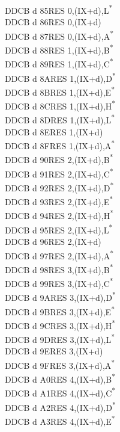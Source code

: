 \documentclass[twoside,openright,a4paper]{book}
\begin{document}
\begin{multicols}{3}
{\begin{tabbing}
	DDCB d 85\>RES 0,(IX+d),L\textsuperscript{*}\\
	DDCB d 86\>RES 0,(IX+d)\\
	DDCB d 87\>RES 0,(IX+d),A\textsuperscript{*}\\
	DDCB d 88\>RES 1,(IX+d),B\textsuperscript{*}\\
	DDCB d 89\>RES 1,(IX+d),C\textsuperscript{*}\\
	DDCB d 8A\>RES 1,(IX+d),D\textsuperscript{*}\\
	DDCB d 8B\>RES 1,(IX+d),E\textsuperscript{*}\\
	DDCB d 8C\>RES 1,(IX+d),H\textsuperscript{*}\\
	DDCB d 8D\>RES 1,(IX+d),L\textsuperscript{*}\\
	DDCB d 8E\>RES 1,(IX+d)\\
	DDCB d 8F\>RES 1,(IX+d),A\textsuperscript{*}\\
	DDCB d 90\>RES 2,(IX+d),B\textsuperscript{*}\\
	DDCB d 91\>RES 2,(IX+d),C\textsuperscript{*}\\
	DDCB d 92\>RES 2,(IX+d),D\textsuperscript{*}\\
	DDCB d 93\>RES 2,(IX+d),E\textsuperscript{*}\\
	DDCB d 94\>RES 2,(IX+d),H\textsuperscript{*}\\
	DDCB d 95\>RES 2,(IX+d),L\textsuperscript{*}\\
	DDCB d 96\>RES 2,(IX+d)\\
	DDCB d 97\>RES 2,(IX+d),A\textsuperscript{*}\\
	DDCB d 98\>RES 3,(IX+d),B\textsuperscript{*}\\
	DDCB d 99\>RES 3,(IX+d),C\textsuperscript{*}\\
	DDCB d 9A\>RES 3,(IX+d),D\textsuperscript{*}\\
	DDCB d 9B\>RES 3,(IX+d),E\textsuperscript{*}\\
	DDCB d 9C\>RES 3,(IX+d),H\textsuperscript{*}\\
	DDCB d 9D\>RES 3,(IX+d),L\textsuperscript{*}\\
	DDCB d 9E\>RES 3,(IX+d)\\
	DDCB d 9F\>RES 3,(IX+d),A\textsuperscript{*}\\
	DDCB d A0\>RES 4,(IX+d),B\textsuperscript{*}\\
	DDCB d A1\>RES 4,(IX+d),C\textsuperscript{*}\\
	DDCB d A2\>RES 4,(IX+d),D\textsuperscript{*}\\
	DDCB d A3\>RES 4,(IX+d),E\textsuperscript{*}\\

\end{tabbing}}
\end{multicols}
\end{document}
